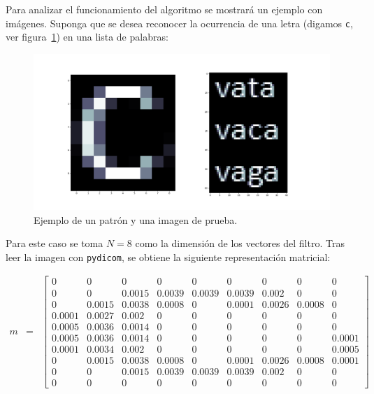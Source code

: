 \par Para analizar el funcionamiento del algoritmo se mostrar\'a un ejemplo con im\'agenes. Suponga que se desea reconocer la ocurrencia de una letra (digamos \texttt{c}, ver figura~\ref{img-ejemplo}) en una lista de palabras:

\begin{figure}[h]
\center
\includegraphics[scale=.2]{Graphics/cWordList.png}
\caption{Ejemplo de un patr\'on y una imagen de prueba.}
\label{img-ejemplo}
\end{figure}

\par Para este caso se toma $N=8$ como la dimensi\'on de los vectores del filtro. Tras leer la imagen con \texttt{pydicom}, se obtiene la siguiente representaci\'on matricial:
\begin{scriptsize}
\begin{eqnarray}
m&=&\left[\begin{array}{rrrrrrrrr}
0&0&0&0&0&0&0&0&0\\
0&0&0.0015&0.0039&0.0039&0.0039&0.002&0&0\\
0&0.0015&0.0038&0.0008&0&0.0001&0.0026&0.0008&0\\
0.0001&0.0027&0.002&0&0&0&0&0&0\\
0.0005&0.0036&0.0014&0&0&0&0&0&0\\
0.0005&0.0036&0.0014&0&0&0&0&0&0.0001\\
0.0001&0.0034&0.002&0&0&0&0&0&0.0005\\
0&0.0015&0.0038&0.0008&0&0.0001&0.0026&0.0008&0.0001\\
0&0&0.0015&0.0039&0.0039&0.0039&0.002&0&0\\
0&0&0&0&0&0&0&0&0
\end{array}\right]\nonumber
\end{eqnarray}
\end{scriptsize}

